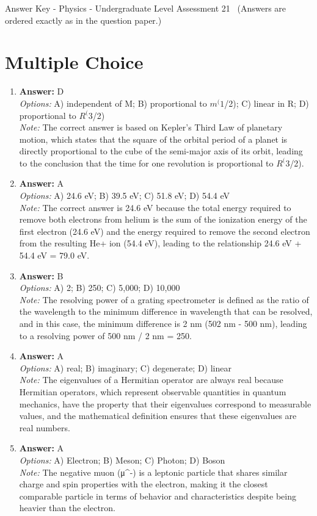 \documentclass[12pt]{article}
\begin{document}
\begin{center}
Answer Key - Physics - Undergraduate Level Assessment 21 \
\small (Answers are ordered exactly as in the question paper.)
\end{center}

\section*{Multiple Choice}
\begin{enumerate}[label=\arabic*.]
\item \textbf{Answer:} D
\\ \textit{Options:} A) independent of M; B) proportional to $m^(1$/2); C) linear in R; D) proportional to $R^(3$/2)
\\ \textit{Note:} The correct answer is based on Kepler's Third Law of planetary motion, which states that the square of the orbital period of a planet is directly proportional to the cube of the semi-major axis of its orbit, leading to the conclusion that the time for one revolution is proportional to $R^(3$/2).
\item \textbf{Answer:} A
\\ \textit{Options:} A) 24.6 eV; B) 39.5 eV; C) 51.8 eV; D) 54.4 eV
\\ \textit{Note:} The correct answer is 24.6 eV because the total energy required to remove both electrons from helium is the sum of the ionization energy of the first electron (24.6 eV) and the energy required to remove the second electron from the resulting He+ ion (54.4 eV), leading to the relationship 24.6 eV + 54.4 eV = 79.0 eV.
\item \textbf{Answer:} B
\\ \textit{Options:} A) 2; B) 250; C) 5,000; D) 10,000
\\ \textit{Note:} The resolving power of a grating spectrometer is defined as the ratio of the wavelength to the minimum difference in wavelength that can be resolved, and in this case, the minimum difference is 2 nm (502 nm - 500 nm), leading to a resolving power of 500 nm / 2 nm = 250.
\item \textbf{Answer:} A
\\ \textit{Options:} A) real; B) imaginary; C) degenerate; D) linear
\\ \textit{Note:} The eigenvalues of a Hermitian operator are always real because Hermitian operators, which represent observable quantities in quantum mechanics, have the property that their eigenvalues correspond to measurable values, and the mathematical definition ensures that these eigenvalues are real numbers.
\item \textbf{Answer:} A
\\ \textit{Options:} A) Electron; B) Meson; C) Photon; D) Boson
\\ \textit{Note:} The negative muon (μ^-) is a leptonic particle that shares similar charge and spin properties with the electron, making it the closest comparable particle in terms of behavior and characteristics despite being heavier than the electron.
\end{enumerate}
\end{document}
